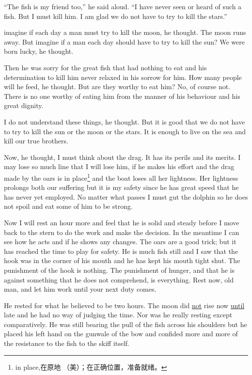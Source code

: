 \documentclass[fontset=ubuntu]{ctexrep}
\begin{document}
``The fish is my friend too,'' he said aloud. ``I have never seen or heard
of such a fish. But I must kill him. I am glad we do not have to try to kill
the stars.''

\Gls{imagine} if each day a man must try to kill the moon, he thought. The moon
runs away. But imagine if a man each day should have to try to kill the sun?
We were born lucky, he thought.

Then he was sorry for the great fish that had nothing to eat and his
\gls{determination} to kill him never \gls{relaxed} in his \gls{sorrow} for
him. How many people will he feed, he thought. But are they worthy to eat
him? No, of course not. There is no one worthy of eating him from the
\gls{manner} of his \gls{behaviour} and his great \gls{dignity}.

I do not understand these things, he thought. But it is good that we do not
have to try to kill the sun or the moon or the stars. It is enough to live
on the sea and kill our true brothers.

Now, he thought, I must think about the drag. It has its \glspl{peril} and
its \glspl{merit}. I may lose so much line that I will lose him, if he makes
his effort and the drag made by the oars is in place\footnote{in place,在原地
  （美）；在正确位置，准备就绪。} and the boat loses all her
\gls{lightness}. Her lightness \glspl{prolong} both our suffering but it is
my safety since he has great speed that he has never yet \gls{employed}. No
matter what passes I must \gls{gut} the dolphin so he does not spoil
and eat some of him to be strong.

Now I will rest an hour more and feel that he is solid and steady before I
move back to the stern to do the work and make the \gls{decision}. In the
\gls{meantime} I can see how he acts and if he shows any changes. The oars
are a good trick; but it has reached the time to play for safety. He is much
fish still and I saw that the hook was in the corner of his mouth and he has
kept his mouth tight shut. The \gls{punishment} of the hook is nothing. The
punishment of hunger, and that he is against something that he does not
\gls{comprehend}, is everything. Rest now, old man, and let him work until your
next duty comes.

He rested for what he believed to be two hours. The moon did \uline{not} rise
now \uline{until} late and he had no way of \gls{judging} the time. Nor was he
really resting except \gls{comparatively}. He was still \gls{bearing} the
pull of the fish across his shoulders but he placed his left hand on the
gunwale of the bow and \gls{confided} more and more of the \gls{resistance}
to the fish to the skiff itself.
\end{document}
